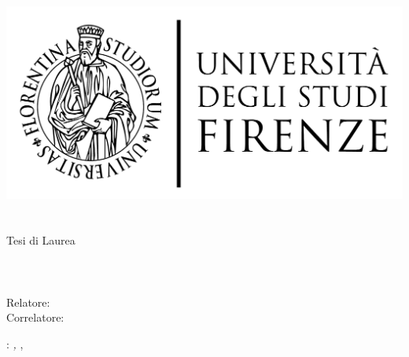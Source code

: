 \begin{titlepage}
	\begin{center}
   	\large
      \hfill
      \vfill
      \begingroup
         \includegraphics[scale=0.15]{logo/LOGO}\\
			\myFaculty \\
			\myDegree \\
			\vspace{0.5cm}
         \vspace{0.5cm}
         Tesi di Laurea
      \endgroup
      \vfill
      \begingroup
      	\color{Maroon}\spacedallcaps{\myItalianTitle} \\ $\ $\\ \spacedallcaps{\myEnglishTitle} \\ $\ $\\
	\bigskip
      \endgroup
      \vfill
      \vfill
            \spacedlowsmallcaps{\myName}
      \vfill
      \vfill
      Relatore: \emph{\myProf}\\
      Correlatore: \emph{\myOtherProf}\\
      \vfill
      \vfill
      \vfill
      \vfill
      \myTime
      \vfill
	\end{center}
\end{titlepage}
   \newpage
	\thispagestyle{empty}
	\hfill
	\vfill
	\noindent\myName:
	\textit{\myItalianTitle,}
	\myDegree, \textcopyright\ \myTime

